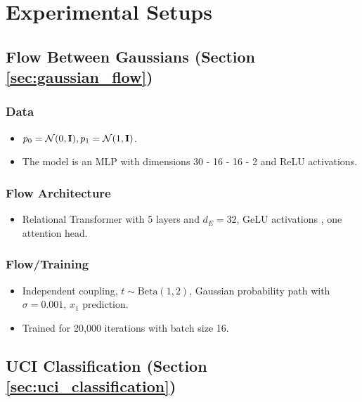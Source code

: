 
\chapter{Experimental Setups}\label{appendix:experimental_setups}

\section*{Flow Between Gaussians (Section \ref{sec:gaussian_flow})}

\subsection*{Data}

\begin{itemize}
    \item $p_0 = \mathcal{N}(0, \mathbf{I}), p_1 = \mathcal{N}(1, \mathbf{I})$. 
    \item The model is an MLP with dimensions 30 - 16 - 16 - 2 and ReLU activations. 
\end{itemize}

\subsection*{Flow Architecture}
\begin{itemize}
    \item Relational Transformer \citep{diaoRelationalAttentionGeneralizing2023,kofinasGraphNeuralNetworks2024} with 5 layers and $d_E = 32$, GeLU activations \citep{hendrycksGaussianErrorLinear2023a}, one attention head. 
\end{itemize}

\subsection*{Flow/Training}
\begin{itemize}
    \item Independent coupling, $t \sim \text{Beta}(1, 2)$, Gaussian probability path with $\sigma = 0.001$, $x_1$ prediction.
    \item Trained for 20,000 iterations with batch size 16. 
\end{itemize}

\section*{UCI Classification (Section \ref{sec:uci_classification})}

